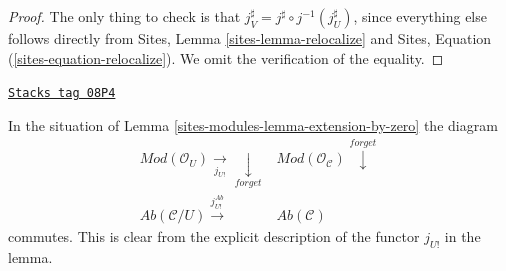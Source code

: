 \begin{proof}
The only thing to check is that
$j_V^\sharp = j^\sharp \circ j^{-1}(j_U^\sharp)$,
since everything else follows directly from
Sites, Lemma \ref{sites-lemma-relocalize} and
Sites, Equation (\ref{sites-equation-relocalize}).
We omit the verification of the equality.
\end{proof}

\begin{remark}
\label{sites-modules-remark-localize-shriek-equal}
\href{https://stacks.math.columbia.edu/tag/08P4}{\texttt{Stacks tag 08P4}}

In the situation of Lemma \ref{sites-modules-lemma-extension-by-zero}
the diagram
$$
\begin{array}{cc}\textit{Mod}(\mathcal{O}_U) \underset{j_{U!}}{\longrightarrow}\underset{forget}{\downarrow} & \textit{Mod}(\mathcal{O}_\mathcal{C}) \overset{forget}{\downarrow} \\ \textit{Ab}(\mathcal{C}/U) \overset{j^{Ab}_{U!}}{\longrightarrow} & \textit{Ab}(\mathcal{C})\end{array}
$$
commutes. This is clear from the explicit description of the functor
$j_{U!}$ in the lemma.
\end{remark}

